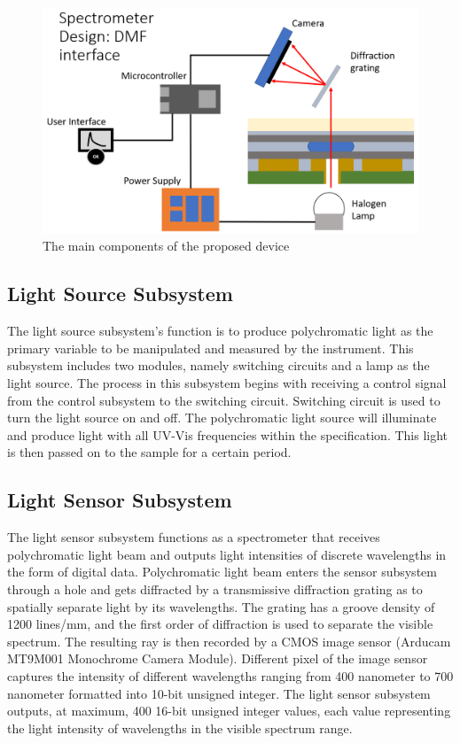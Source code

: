 \documentclass[conference]{IEEEtran}
\begin{document}
    \begin{figure}[htbp]
    \centerline{\includegraphics[scale=0.27]{dmf-hardware-scheme.png}}
    \caption{The main components of the proposed device}
    \label{dmf-hardware-scheme}
    \end{figure}

\subsection{Light Source Subsystem}
The light source subsystem's function is to produce polychromatic light as the primary variable to be manipulated and measured by the instrument.
This subsystem includes two modules, namely switching circuits and a lamp as the light source.
The process in this subsystem begins with receiving a control signal from the control subsystem to the switching circuit.
Switching circuit is used to turn the light source on and off.
The polychromatic light source will illuminate and produce light with all UV-Vis frequencies within the specification.
This light is then passed on to the sample for a certain period.

\subsection{Light Sensor Subsystem}
The light sensor subsystem functions as a spectrometer that receives polychromatic light beam and outputs light intensities of discrete wavelengths in the form of digital data.
Polychromatic light beam enters the sensor subsystem through a hole and gets diffracted by a transmissive diffraction grating as to spatially separate light by its wavelengths.
The grating has a groove density of 1200 lines/mm, and the first order of diffraction is used to separate the visible spectrum.
The resulting ray is then recorded by a CMOS image sensor (Arducam MT9M001 Monochrome Camera Module).
Different pixel of the image sensor captures the intensity of different wavelengths ranging from 400 nanometer to 700 nanometer formatted into 10-bit unsigned integer.
The light sensor subsystem outputs, at maximum, 400 16-bit unsigned integer values, each value representing the light intensity of wavelengths in the visible spectrum range. 
\end{document}
